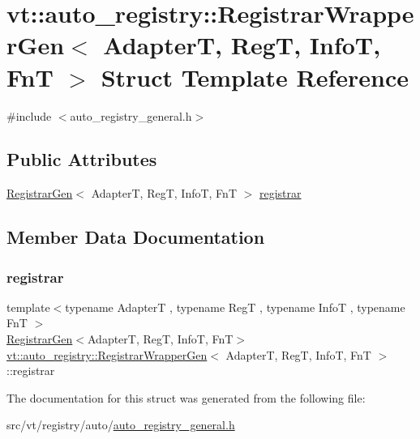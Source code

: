 \hypertarget{structvt_1_1auto__registry_1_1_registrar_wrapper_gen}{}\section{vt\+:\+:auto\+\_\+registry\+:\+:Registrar\+Wrapper\+Gen$<$ AdapterT, RegT, InfoT, FnT $>$ Struct Template Reference}
\label{structvt_1_1auto__registry_1_1_registrar_wrapper_gen}


{\ttfamily \#include $<$auto\+\_\+registry\+\_\+general.\+h$>$}

\subsection*{Public Attributes}
\begin{DoxyCompactItemize}
\item 
\hyperlink{structvt_1_1auto__registry_1_1_registrar_gen}{Registrar\+Gen}$<$ AdapterT, RegT, InfoT, FnT $>$ \hyperlink{structvt_1_1auto__registry_1_1_registrar_wrapper_gen_a5f5d8dbaf072b2eaba56990e0af2b12d}{registrar}
\end{DoxyCompactItemize}


\subsection{Member Data Documentation}
\mbox{\label{structvt_1_1auto__registry_1_1_registrar_wrapper_gen_a5f5d8dbaf072b2eaba56990e0af2b12d}} 
\subsubsection{\texorpdfstring{registrar}{registrar}}
{\footnotesize\ttfamily template$<$typename AdapterT , typename RegT , typename InfoT , typename FnT $>$ \\
\hyperlink{structvt_1_1auto__registry_1_1_registrar_gen}{Registrar\+Gen}$<$AdapterT, RegT, InfoT, FnT$>$ \hyperlink{structvt_1_1auto__registry_1_1_registrar_wrapper_gen}{vt\+::auto\+\_\+registry\+::\+Registrar\+Wrapper\+Gen}$<$ AdapterT, RegT, InfoT, FnT $>$\+::registrar}



The documentation for this struct was generated from the following file\+:\begin{DoxyCompactItemize}
\item 
src/vt/registry/auto/\hyperlink{auto__registry__general_8h}{auto\+\_\+registry\+\_\+general.\+h}\end{DoxyCompactItemize}
